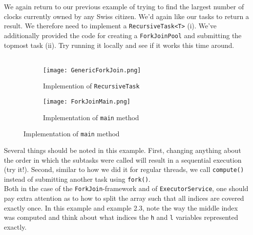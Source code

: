 \documentclass[main.tex]{subfiles}
\begin{document}
\begin{example}
    We again return to our previous example of trying to find the largest number of clocks currently owned by any Swiss citizen. We'd again like our tasks to return a result. We therefore need to implement a \texttt{RecursiveTask<T>} (i). We've additionally provided the code for creating a \texttt{ForkJoinPool} and submitting the topmost task (ii). Try running it locally and see if it works this time around. \\
    \\
    \begin{figure}[H]
        \centering
        \begin{subfigure}{.5\textwidth}
            \centering
            \texttt{[image: GenericForkJoin.png]}
            \caption{Implemention of \texttt{RecursiveTask}}
        \end{subfigure}%
        \begin{subfigure}{.5\textwidth}
            \centering
            \texttt{[image: ForkJoinMain.png]}
            \caption{Implementation of \texttt{main} method}
        \end{subfigure}
    \end{figure}
    \noindent Several things should be noted in this example. First, changing anything about the order in which the subtasks were called will result in a sequential execution (try it!). Second, similar to how we did it for regular threads, we call \texttt{compute()} instead of submitting another task using \texttt{fork()}.\\
    Both in the case of the \texttt{ForkJoin}-framework and of \texttt{ExecutorService}, one should pay extra attention as to how to split the array such that all indices are covered exactly once. In this example and example 2.3, note the way the middle index was computed and think about what indices the \texttt{h} and \texttt{l} variables represented exactly.
\end{example}
\pagebreak
\end{document}
